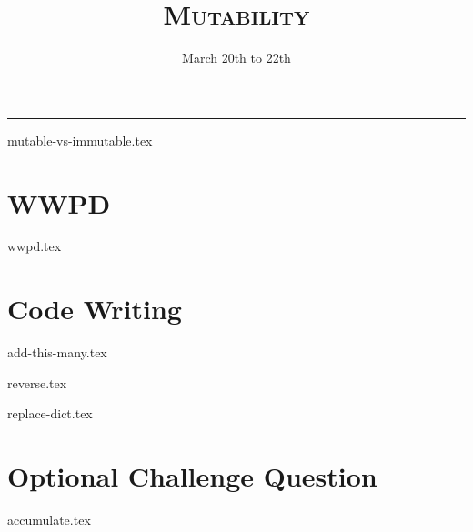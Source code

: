 \documentclass{exam}
\title{\textsc{Mutability}}
\date{March 20th to 22th}
\begin{document}
\maketitle
\rule{\textwidth}{0.15em}
\fontsize{12}{15}\selectfont


{mutable-vs-immutable.tex}
\newpage
\section{WWPD}
\begin{questions}

{wwpd.tex}
\newpage

\section{Code Writing}
{add-this-many.tex}

{reverse.tex}

{replace-dict.tex}
\newpage
\section{Optional Challenge Question}
{accumulate.tex}

\end{questions}
\end{document}
